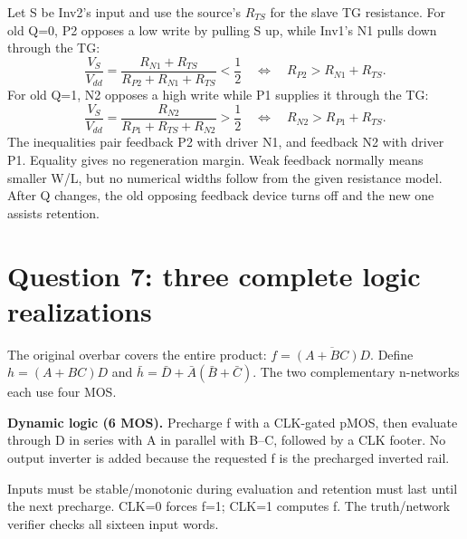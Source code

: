 \documentclass[10pt]{article}
\newcommand{\mos}[4]{\begin{scope}[shift={(#1,#2)}]
\draw(0,.24)--(0,-.24);\draw(0,.2)--(.25,.2)--(.25,.5);\draw(0,-.2)--(.25,-.2)--(.25,-.5);
\draw(-.16,.23)--(-.16,-.23);
\ifnum#4=1\draw(-.26,0)circle(.06);\draw(-.75,0)--(-.32,0);\else\draw(-.75,0)--(-.16,0);\fi
\node[anchor=east,font=\scriptsize]at(-.76,0){$#3$};\end{scope}}
\begin{document}
Let S be Inv2's input and use the source's $R_{TS}$ for the slave TG resistance. For old Q=0, P2 opposes a low write by pulling S up, while Inv1's N1 pulls down through the TG:
\[\frac{V_S}{V_{dd}}=\frac{R_{N1}+R_{TS}}{R_{P2}+R_{N1}+R_{TS}}<\frac12
\quad\Longleftrightarrow\quad\boxed{R_{P2}>R_{N1}+R_{TS}.}\]
For old Q=1, N2 opposes a high write while P1 supplies it through the TG:
\[\frac{V_S}{V_{dd}}=\frac{R_{N2}}{R_{P1}+R_{TS}+R_{N2}}>\frac12
\quad\Longleftrightarrow\quad\boxed{R_{N2}>R_{P1}+R_{TS}.}\]
The inequalities pair feedback P2 with driver N1, and feedback N2 with driver P1. Equality gives no regeneration margin. Weak feedback normally means smaller W/L, but no numerical widths follow from the given resistance model. After Q changes, the old opposing feedback device turns off and the new one assists retention.
\newpage
\section*{Question 7: three complete logic realizations}
The original overbar covers the entire product: $f=\overline{(A+BC)D}$. Define $h=(A+BC)D$ and $\bar h=\bar D+\bar A(\bar B+\bar C)$. The two complementary n-networks each use four MOS.

\textbf{Dynamic logic (6 MOS).} Precharge f with a CLK-gated pMOS, then evaluate through D in series with A in parallel with B--C, followed by a CLK footer. No output inverter is added because the requested f is the precharged inverted rail.
\begin{center}\end{center}
Inputs must be stable/monotonic during evaluation and retention must last until the next precharge. CLK=0 forces f=1; CLK=1 computes f. The truth/network verifier checks all sixteen input words.
\end{document}
